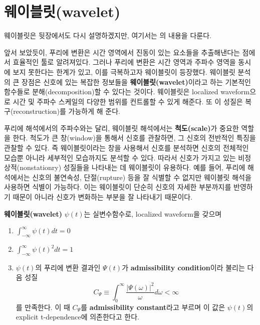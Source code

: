 \documentclass[b5paper,]{scrbook}
\theoremstyle{plain}
\theoremstyle{definition}
\numberwithin{equation}{section}
\let\BeginKnitrBlock\begin \let\EndKnitrBlock\end
\begin{document}
\hypertarget{wavelet}{%
\section{웨이블릿(wavelet)}\label{wavelet}}

웨이블릿은 뒷장에서도 다시 설명하겠지만, 여기서는 \citep{Shima2016}의 내용을 다룬다.

앞서 보았듯이, 푸리에 변환은 시간 영역에서 진동이 있는 요소들을 추출해낸다는 점에서 효율적인 툴로 알려져있다. 그러나 푸리에 변환은 시간 영역과 주파수 영역을 동시에 보지 못한다는 한계가 있고, 이를 극복하고자 웨이블릿이 등장했다. 웨이블릿 분석의 큰 장점은 신호에 있는 복잡한 정보들을 \textbf{웨이블릿(wavelet)}이라고 하는 기본적인 함수들로 분해(decomposition)할 수 있다는 것이다. 웨이블릿은 localized waveform으로 시간 및 주파수 스케일의 다양한 범위를 컨트롤할 수 있게 해준다. 또 이 성질은 복구(reconstruction)를 가능하게 해 준다.

푸리에 해석에서의 주파수와는 달리, 웨이블릿 해석에서는 \textbf{척도(scale)}가 중요한 역할을 한다. 척도가 큰 창(window)을 통해서 신호를 관찰하면, 그 신호의 전반적인 특징을 관찰할 수 있다. 즉 웨이블릿이라는 창을 사용해서 신호를 분석하면 신호의 전체적인 모습뿐 아니라 세부적인 모습까지도 분석할 수 있다. 따라서 신호가 가지고 있는 비정상적(nonstationry) 성질들을 나타내는 데 웨이블릿이 유용하다. 예를 들어, 푸리에 해석에서는 신호의 불연속성, 단절(rupture) 등을 잘 식별할 수 없지만 웨이블릿 해석을 사용하면 식별이 가능하다. 이는 웨이블릿이 단순히 신호의 자세한 부분까지를 반영하기 때문이 아니라 신호가 변화하는 부분을 잘 나타내기 때문이다.

\BeginKnitrBlock{definition}[웨이블릿]
\protect\hypertarget{def:unnamed-chunk-253}{}{\label{def:unnamed-chunk-253} {} }\textbf{웨이블릿(wavelet)} \(\psi(t)\)는 실변수함수로, localized waveform을 갖으며

\begin{enumerate}
\def\labelenumi{\arabic{enumi}.}
\item
  \(\int_{-\infty}^{\infty}\psi(t)dt=0\)
\item
  \(\int_{-\infty}^{\infty}\psi(t)^{2}dt=1\)
\item
  \(\psi(t)\)의 푸리에 변환 결과인 \(\Psi(t)\)가 \textbf{admissibility condition}이라 불리는 다음 성질
  \[C_{\Psi}\equiv\int_{0}^{\infty}\frac{|\Psi(\omega) |^{2}}{\omega}d\omega <\infty\]
  를 만족한다. 이 때 \(C_{\Psi}\)를 \textbf{admissibility constant}라고 부르며 이 값은 \(\psi(t)\)의 explicit t-dependence에 의존한다고 한다.
\end{enumerate}
\EndKnitrBlock{definition}
\end{document}
